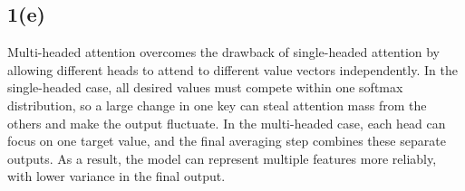 \begin{answer}
\section*{1(e)}
Multi-headed attention overcomes the drawback of single-headed attention by allowing different heads to attend to different value vectors independently. In the single-headed case, all desired values must compete within one softmax distribution, so a large change in one key can steal attention mass from the others and make the output fluctuate. In the multi-headed case, each head can focus on one target value, and the final averaging step combines these separate outputs. As a result, the model can represent multiple features more reliably, with lower variance in the final output.
\end{answer}
